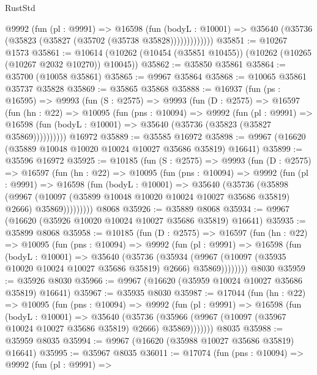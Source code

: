 \begin{lexlean}{RustStd}
\begin{coremodule}
              @9992
                (fun (pl : @9991) =>
                @16598
                  (fun (bodyL : @10001) =>
                  @35640 (@35736 (@35823 (@35827 (@35702 (@35738 @35828)))))))))))))
@35851 := @10267 @1573
@35861 := @10614 (@10262 (@10454 (@35851 @10455)) (@10262 (@10265 (@10267 @2032 @10270)) @10045))
@35862 := @35850 @35861
@35864 := @35700 (@10058 @35861)
@35865 := @9967 @35864
@35868 := @10065 @35861 @35737 @35828
@35869 := @35865 @35868
@35888 := @16937
    (fun (ps : @16595) =>
    @9993
      (fun (S : @2575) =>
      @9993
        (fun (D : @2575) =>
        @16597
          (fun (hn : @22) =>
          @10095
            (fun (pns : @10094) =>
            @9992
              (fun (pl : @9991) =>
              @16598 (fun (bodyL : @10001) => @35640 (@35736 (@35823 (@35827 @35869))))))))))
    @16972
@35889 := @35585 @16972
@35898 := @9967 (@16620 (@35889 @10048 @10020 @10024 @10027 @35686 @35819) @16641)
@35899 := @35596 @16972
@35925 := @10185
    (fun (S : @2575) =>
    @9993
      (fun (D : @2575) =>
      @16597
        (fun (hn : @22) =>
        @10095
          (fun (pns : @10094) =>
          @9992
            (fun (pl : @9991) =>
            @16598
              (fun (bodyL : @10001) =>
              @35640
                (@35736
                  (@35898
                    (@9967
                      (@10097 (@35899 @10048 @10020 @10024 @10027 @35686 @35819) @2666)
                      @35869)))))))))
    @8068
@35926 := @35889 @8068
@35934 := @9967 (@16620 (@35926 @10020 @10024 @10027 @35686 @35819) @16641)
@35935 := @35899 @8068
@35958 := @10185
    (fun (D : @2575) =>
    @16597
      (fun (hn : @22) =>
      @10095
        (fun (pns : @10094) =>
        @9992
          (fun (pl : @9991) =>
          @16598
            (fun (bodyL : @10001) =>
            @35640
              (@35736
                (@35934
                  (@9967 (@10097 (@35935 @10020 @10024 @10027 @35686 @35819) @2666) @35869))))))))
    @8030
@35959 := @35926 @8030
@35966 := @9967 (@16620 (@35959 @10024 @10027 @35686 @35819) @16641)
@35967 := @35935 @8030
@35987 := @17044
    (fun (hn : @22) =>
    @10095
      (fun (pns : @10094) =>
      @9992
        (fun (pl : @9991) =>
        @16598
          (fun (bodyL : @10001) =>
          @35640
            (@35736 (@35966 (@9967 (@10097 (@35967 @10024 @10027 @35686 @35819) @2666) @35869)))))))
    @8035
@35988 := @35959 @8035
@35994 := @9967 (@16620 (@35988 @10027 @35686 @35819) @16641)
@35995 := @35967 @8035
@36011 := @17074
    (fun (pns : @10094) =>
    @9992
      (fun (pl : @9991) =>

\end{coremodule}
\end{lexlean}
